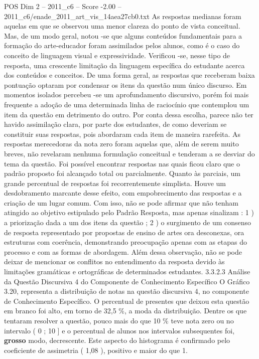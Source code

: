 \begin{textsample}{POS Dim 2 – 2011\_c6 – Score -2.00 – 2011\_c6/enade\_2011\_art\_vis\_14aea27cb0.txt}
As respostas medianas foram aquelas em que se observou uma menor clareza do ponto de vista conceitual.
Mas, de um modo geral, notou -se que alguns conteúdos fundamentais para a formação do arte-educador foram assimilados pelos alunos, como é o caso do conceito de linguagem visual e expressividade.
Verificou -se, nesse tipo de resposta, uma crescente limitação da linguagem específica do estudante acerca dos conteúdos e conceitos.
De uma forma geral, as respostas que receberam baixa pontuação optaram por condensar os itens da questão num único discurso.
Em momentos isolados percebeu -se um aprofundamento discursivo, porém foi mais frequente a adoção de uma determinada linha de raciocínio que contemplou um item da questão em detrimento do outro.
Por conta dessa escolha, parece não ter havido assimilação clara, por parte dos estudantes, de como deveriam se constituir suas respostas, pois abordaram cada item de maneira rarefeita.
As respostas merecedoras da nota zero foram aquelas que, além de serem muito breves, não revelaram nenhuma formulação conceitual e tenderam a se desviar do tema da questão.
Foi possível encontrar respostas nas quais ficou claro que o padrão proposto foi alcançado total ou parcialmente.
Quanto às parciais, um grande percentual de respostas foi recorrentemente simplista.
Houve um desdobramento marcante desse efeito, com empobrecimento das respostas e a criação de um lugar comum.
Com isso, não se pode afirmar que não tenham atingido ao objetivo estipulado pelo Padrão Resposta, mas apenas sinalizam : 1 ) a priorização dada a um dos itens da questão ; 2 ) o surgimento de um consenso de resposta representado por propostas de ensino de artes ora desconexas, ora estruturas com coerência, demonstrando preocupação apenas com as etapas do processo e com as formas de abordagem.
Além dessa observação, não se pode deixar de mencionar os conflitos no entendimento da resposta devido às limitações gramáticas e ortográficas de determinados estudantes. 3.3.2.3 Análise da Questão Discursiva 4 do Componente de Conhecimento Específico O Gráfico 3.20, representa a distribuição de notas na questão discursiva 4, no componente de Conhecimento Específico.
O percentual de presentes que deixou esta questão em branco foi alto, em torno de 32,5 \%, a moda da distribuição.
Dentre os que tentaram resolver a questão, pouco mais do que 10 \% teve nota zero ou no intervalo ( 0 ; 10 ] e o percentual de alunos nos intervalos subsequentes foi, \textbf{grosso} modo, decrescente.
Este aspecto do histograma é confirmado pelo coeficiente de assimetria ( 1,08 ), positivo e maior do que 1.

\end{textsample}

